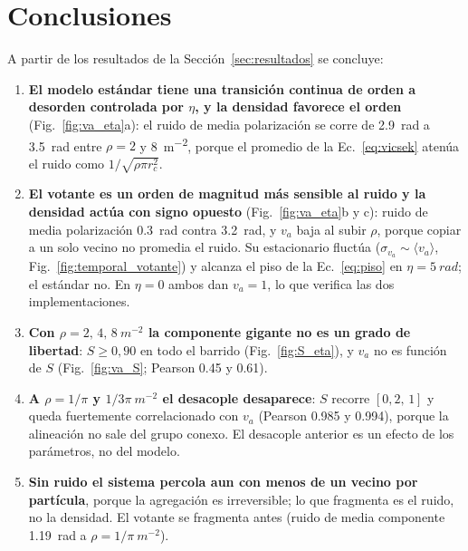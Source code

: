 \documentclass[10pt,a4paper]{article}
\newcommand{\va}{\ensuremath{v_a}}
\begin{document}
\section{Conclusiones}

A partir de los resultados de la Sección~\ref{sec:resultados} se concluye:

\begin{enumerate}
    \setlength{\itemsep}{0pt}
    \item \textbf{El modelo estándar tiene una transición continua de orden a
          desorden controlada por $\eta$, y la densidad favorece el orden}
          (Fig.~\ref{fig:va_eta}a): el ruido de media polarización se corre de
          \SI{2.9}{rad} a \SI{3.5}{rad} entre $\rho = 2$ y \SI{8}{m^{-2}},
          porque el promedio de la Ec.~\eqref{eq:vicsek} atenúa el ruido como
          $1/\sqrt{\rho \pi r_c^2}$.

    \item \textbf{El votante es un orden de magnitud más sensible al ruido y la
          densidad actúa con signo opuesto} (Fig.~\ref{fig:va_eta}b y c): ruido
          de media polarización \SI{0.3}{rad} contra \SI{3.2}{rad}, y \va{}
          baja al subir $\rho$, porque copiar a un solo vecino no promedia el
          ruido. Su estacionario fluctúa
          ($\sigma_{\va} \sim \langle \va \rangle$,
          Fig.~\ref{fig:temporal_votante}) y alcanza el piso de la
          Ec.~\eqref{eq:piso} en $\eta = \SI{5}{rad}$; el estándar no. En
          $\eta = 0$ ambos dan $\va = 1$, lo que verifica las dos
          implementaciones.

    \item \textbf{Con $\rho = 2,\,4,\,\SI{8}{m^{-2}}$ la componente gigante no
          es un grado de libertad}: $S \ge 0{,}90$ en todo el barrido
          (Fig.~\ref{fig:S_eta}), y \va{} no es función de $S$
          (Fig.~\ref{fig:va_S}; Pearson \num{0.45} y \num{0.61}).

    \item \textbf{A $\rho = 1/\pi$ y $1/3\pi\ \si{m^{-2}}$ el desacople
          desaparece}: $S$ recorre $[0{,}2,\,1]$ y queda fuertemente
          correlacionado con \va{} (Pearson \num{0.985} y \num{0.994}), porque
          la alineación no sale del grupo conexo. El desacople anterior es un
          efecto de los parámetros, no del modelo.

    \item \textbf{Sin ruido el sistema percola aun con menos de un vecino por
          partícula}, porque la agregación es irreversible; lo que fragmenta es
          el ruido, no la densidad. El votante se fragmenta antes (ruido de
          media componente \SI{1.19}{rad} a $\rho = 1/\pi\ \si{m^{-2}}$).


\end{enumerate}
\end{document}
